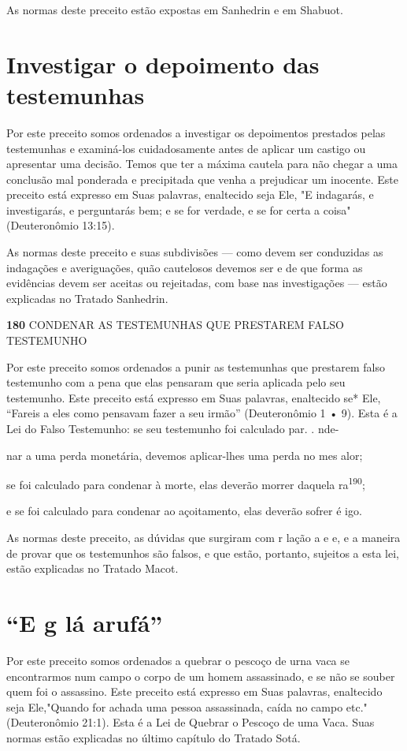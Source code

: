 As normas deste preceito estão expostas em Sanhedrin e em Shabuot.


\section{Investigar o depoimento das testemunhas}

Por este preceito somos ordenados a investigar os depoimentos pres­tados
pelas testemunhas e examiná-los cuidadosamente antes de aplicar um
cas­tigo ou apresentar uma decisão. Temos que ter a máxima cautela para
não che­gar a uma conclusão mal ponderada e precipitada que venha a
prejudicar um inocente. Este preceito está expresso em Suas palavras,
enaltecido seja Ele, "E indagarás, e investigarás, e perguntarás bem; e
se for verdade, e se for certa a coisa" (Deuteronômio 13:15).

As normas deste preceito e suas subdivisões --- como devem ser
con­duzidas as indagações e averiguações, quão cautelosos devemos ser e
de que forma as evidências devem ser aceitas ou rejeitadas, com base nas
investiga­ções --- estão explicadas no Tratado Sanhedrin.

\textbf{180} CONDENAR AS TESTEMUNHAS QUE PRESTAREM FALSO TESTEMUNHO

Por este preceito somos ordenados a punir as testemunhas que pres­tarem
falso testemunho com a pena que elas pensaram que seria aplicada pelo
seu testemunho. Este preceito está expresso em Suas palavras, enaltecido
se* Ele, ``Fareis a eles como pensavam fazer a seu irmão'' (Deuteronômio 1
• 9). Esta é a Lei do Falso Testemunho: se seu testemunho foi calculado
par. . nde-

nar a uma perda monetária, devemos aplicar-lhes uma perda no mes alor;

se foi calculado para condenar à morte, elas deverão morrer daquela
ra\textsuperscript{190};

e se foi calculado para condenar ao açoitamento, elas deverão sofrer é
igo.

As normas deste preceito, as dúvidas que surgiram com r lação a e e, e a
maneira de provar que os testemunhos são falsos, e que estão, portanto,
sujeitos a esta lei, estão explicadas no Tratado Macot.

\section{``E g lá arufá''}

Por este preceito somos ordenados a quebrar o pescoço de urna vaca se
encontrarmos num campo o corpo de um homem assassinado, e se não se
souber quem foi o assassino. Este preceito está expresso em Suas
pala­vras, enaltecido seja Ele,"Quando for achada uma pessoa
assassinada, caída no campo etc." (Deuteronômio 21:1). Esta é a Lei de
Quebrar o Pescoço de uma Vaca. Suas normas estão explicadas no último
capítulo do Tratado Sotá.

